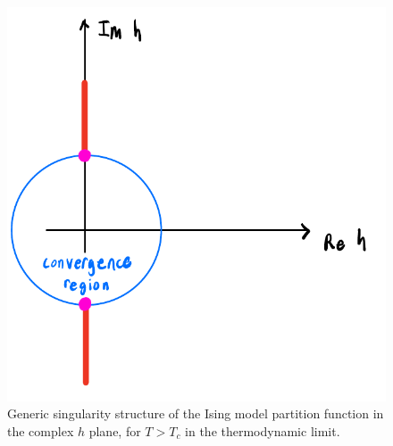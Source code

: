\begin{figure} 
    \centering
    \includegraphics[width=\linewidth]{figs/LYE.pdf}
    \caption{
        Generic singularity structure of the Ising model partition function in the
        complex $h$ plane, for $T>T_c$ in the thermodynamic limit.
    }
    \label{fig:LYE}
\end{figure}


